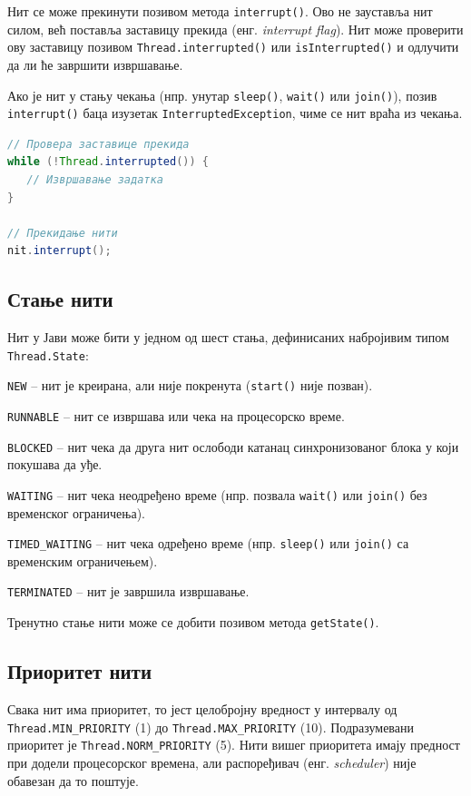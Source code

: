 Нит се може прекинути позивом метода \texttt{interrupt()}. Ово не зауставља нит силом, већ поставља заставицу прекида (енг. \textit{interrupt flag}). Нит може проверити ову заставицу позивом \texttt{Thread.interrupted()} или \texttt{isInterrupted()} и одлучити да ли ће завршити извршавање.

Ако је нит у стању чекања (нпр. унутар \texttt{sleep()}, \texttt{wait()} или \texttt{join()}), позив \texttt{interrupt()} баца изузетак \texttt{InterruptedException}, чиме се нит враћа из чекања.


\begin{lstlisting}[language=Java]
// Провера заставице прекида
while (!Thread.interrupted()) {
   // Извршавање задатка
}
 
// Прекидање нити
nit.interrupt();
\end{lstlisting}


\subsection{Стање нити}

Нит у Јави може бити у једном од шест стања, дефинисаних набројивим типом \texttt{Thread.State}:

\texttt{NEW} – нит је креирана, али није покренута (\texttt{start()} није позван).

\texttt{RUNNABLE} – нит се извршава или чека на процесорско време.

\texttt{BLOCKED} – нит чека да друга нит ослободи катанац синхронизованог блока у који покушава да уђе.

\texttt{WAITING} – нит чека неодређено време (нпр. позвала \texttt{wait()} или \texttt{join()} без временског ограничења).

\texttt{TIMED\_WAITING} – нит чека одређено време (нпр. \texttt{sleep()} или \texttt{join()} са временским ограничењем).

\texttt{TERMINATED} – нит је завршила извршавање.

Тренутно стање нити може се добити позивом метода \texttt{getState()}.


\subsection{Приоритет нити}

Свака нит има приоритет, то јест целобројну вредност у интервалу од \texttt{Thread.MIN\_PRIORITY} (1) до \texttt{Thread.MAX\_PRIORITY} (10). Подразумевани приоритет је \texttt{Thread.NORM\_PRIORITY} (5). Нити вишег приоритета имају предност при додели процесорског времена, али распоређивач (енг. \textit{scheduler}) није обавезан да то поштује.

